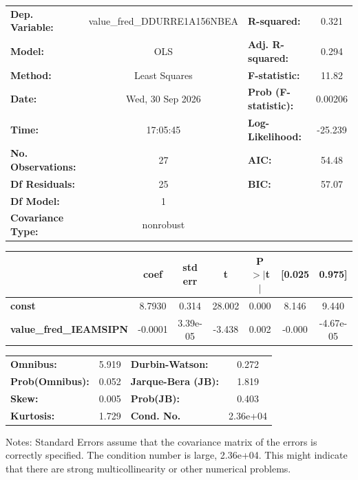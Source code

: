 \begin{center}
\begin{tabular}{lclc}
\toprule
\textbf{Dep. Variable:}        & value\_fred\_DDURRE1A156NBEA & \textbf{  R-squared:         } &     0.321   \\
\textbf{Model:}                &             OLS              & \textbf{  Adj. R-squared:    } &     0.294   \\
\textbf{Method:}               &        Least Squares         & \textbf{  F-statistic:       } &     11.82   \\
\textbf{Date:}                 &       Wed, 30 Sep 2026       & \textbf{  Prob (F-statistic):} &  0.00206    \\
\textbf{Time:}                 &           17:05:45           & \textbf{  Log-Likelihood:    } &   -25.239   \\
\textbf{No. Observations:}     &                27            & \textbf{  AIC:               } &     54.48   \\
\textbf{Df Residuals:}         &                25            & \textbf{  BIC:               } &     57.07   \\
\textbf{Df Model:}             &                 1            & \textbf{                     } &             \\
\textbf{Covariance Type:}      &          nonrobust           & \textbf{                     } &             \\
\bottomrule
\end{tabular}
\begin{tabular}{lcccccc}
                               & \textbf{coef} & \textbf{std err} & \textbf{t} & \textbf{P$> |$t$|$} & \textbf{[0.025} & \textbf{0.975]}  \\
\midrule
\textbf{const}                 &       8.7930  &        0.314     &    28.002  &         0.000        &        8.146    &        9.440     \\
\textbf{value\_fred\_IEAMSIPN} &      -0.0001  &     3.39e-05     &    -3.438  &         0.002        &       -0.000    &    -4.67e-05     \\
\bottomrule
\end{tabular}
\begin{tabular}{lclc}
\textbf{Omnibus:}       &  5.919 & \textbf{  Durbin-Watson:     } &    0.272  \\
\textbf{Prob(Omnibus):} &  0.052 & \textbf{  Jarque-Bera (JB):  } &    1.819  \\
\textbf{Skew:}          &  0.005 & \textbf{  Prob(JB):          } &    0.403  \\
\textbf{Kurtosis:}      &  1.729 & \textbf{  Cond. No.          } & 2.36e+04  \\
\bottomrule
\end{tabular}
\end{center}

Notes: \newline
 [1] Standard Errors assume that the covariance matrix of the errors is correctly specified. \newline
 [2] The condition number is large, 2.36e+04. This might indicate that there are \newline
 strong multicollinearity or other numerical problems.
